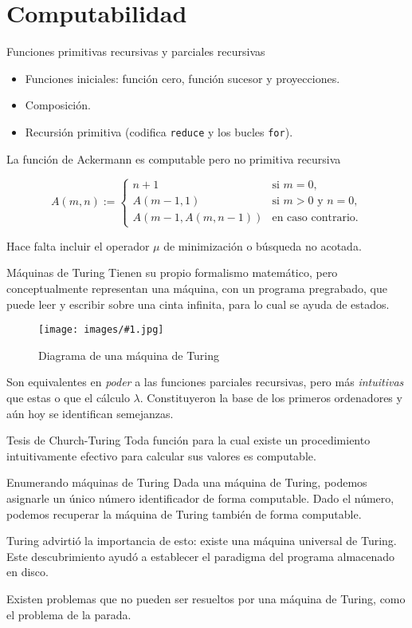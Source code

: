 \documentclass[10pt]{beamer}
\newcommand{\ffigure}[2]{
  \begin{figure}[h!]
    \centering
    \texttt{[image: images/\#1.jpg]}
    \caption{#2}
    \label{fig:#1}
  \end{figure}
}
\begin{document}
\section{Computabilidad}

\begin{frame}[fragile]{Funciones primitivas recursivas y parciales recursivas}
  \begin{itemize}
  \item Funciones iniciales: función cero, función sucesor y proyecciones.
  \item Composición.
  \item Recursión primitiva (codifica \texttt{reduce} y los bucles \texttt{for}).
  \end{itemize}

  La función de Ackermann es computable pero no primitiva recursiva

  \[
    A(m, n) :=
    \begin{cases}
      n + 1 & \text{si } m = 0, \\
      A(m - 1, 1) & \text{si } m > 0 \text{ y } n = 0, \\
      A(m - 1, A(m, n - 1)) & \text{en caso contrario.}
    \end{cases}
  \]

  Hace falta incluir el operador $\mu$ de minimización o búsqueda no acotada.
\end{frame}

\begin{frame}[fragile]{Máquinas de Turing}
  Tienen su propio formalismo matemático, pero conceptualmente representan una máquina, con un programa pregrabado, que puede leer y escribir sobre una cinta infinita, para lo cual se ayuda de estados.

  \ffigure{turing-machine}{Diagrama de una máquina de Turing}

  Son equivalentes en \emph{poder} a las funciones parciales recursivas, pero más \emph{intuitivas} que estas o que el cálculo $\lambda$. Constituyeron la base de los primeros ordenadores y aún hoy se identifican semejanzas.
\end{frame}

\begin{frame}[fragile]{Tesis de Church-Turing}
  Toda función para la cual existe un procedimiento intuitivamente efectivo para calcular sus valores es computable.
\end{frame}

\begin{frame}[fragile]{Enumerando máquinas de Turing}
  Dada una máquina de Turing, podemos asignarle un único número identificador de forma computable. Dado el número, podemos recuperar la máquina de Turing también de forma computable.

  Turing advirtió la importancia de esto: existe una máquina \alert{universal} de Turing. Este descubrimiento ayudó a establecer el paradigma del programa almacenado en disco.

  Existen problemas que no pueden ser resueltos por una máquina de Turing, como el \alert{problema de la parada}.
\end{frame}
\end{document}
